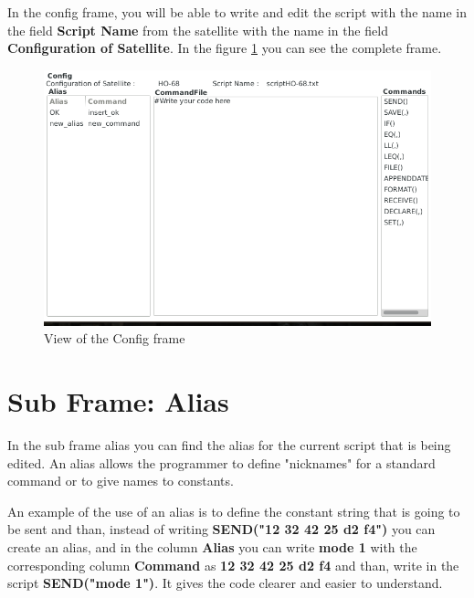 \documentclass[pdftex,11pt,a4paper,titlepage]{report}
\begin{document}
\hspace{0.4cm} In the config frame, you will be able to write and edit the script with the name in the field \textbf{Script Name} from the satellite with the name in the field \textbf{Configuration of Satellite}. In the figure \ref{ConfigFrame} you can see the complete frame.
\begin{figure}[h]
\centering
\includegraphics[scale=0.6]{../images/ConfigFrame.png}
\caption{View of the Config frame}
\label{ConfigFrame}
\end{figure}
\section{Sub Frame: Alias}
\hspace{0.4cm} In the sub frame alias you can find the alias for the current script that is being edited. An alias allows the programmer to define "nicknames" for a standard command or to give names to constants.

An example of the use of an alias is to define the constant string that is going to be sent and than, instead of writing \textbf{SEND("12 32 42 25 d2 f4")} you can create an alias, and in the column \textbf{Alias} you can write \textbf{mode 1} with the corresponding column \textbf{Command} as \textbf{12 32 42 25 d2 f4} and than, write in the script \textbf{SEND("mode 1")}. It gives the code clearer and easier to understand. 
\end{document}
